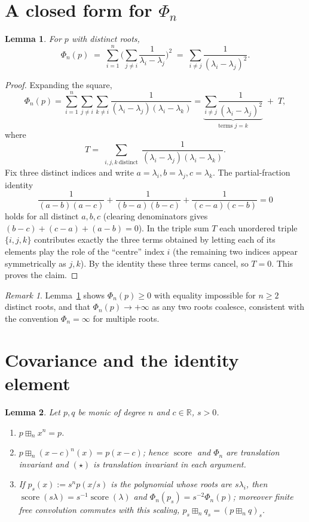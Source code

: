 \documentclass[12pt]{article}
\newtheorem{lemma}{Lemma}
\theoremstyle{remark}
\newtheorem*{remark}{Remark}
\DeclareMathOperator{\score}{score}
\newcommand{\bR}{\mathbb{R}}
\newcommand{\boxp}{\boxplus_n}
\begin{document}
\section{A closed form for $\Phi_n$}\label{sec:identity}

\begin{lemma}\label{lem:phiform}
For $p$ with distinct roots,
\[
\Phi_n(p)\;=\;\sum_{i=1}^n\Big(\sum_{j\neq i}\frac{1}{\lambda_i-\lambda_j}\Big)^2
\;=\;\sum_{i\neq j}\frac{1}{(\lambda_i-\lambda_j)^2}.
\]
\end{lemma}

\begin{proof}
Expanding the square,
\[
\Phi_n(p)=\sum_{i=1}^n\sum_{j\neq i}\sum_{k\neq i}
\frac{1}{(\lambda_i-\lambda_j)(\lambda_i-\lambda_k)}
=\underbrace{\sum_{i\neq j}\frac{1}{(\lambda_i-\lambda_j)^2}}_{\text{terms }j=k}
\;+\;T,
\]
where
\[
T=\sum_{\substack{i,j,k\ \text{distinct}}}
\frac{1}{(\lambda_i-\lambda_j)(\lambda_i-\lambda_k)} .
\]
Fix three distinct indices and write $a=\lambda_i,b=\lambda_j,c=\lambda_k$.
The partial-fraction identity
\[
\frac{1}{(a-b)(a-c)}+\frac{1}{(b-a)(b-c)}+\frac{1}{(c-a)(c-b)}=0
\]
holds for all distinct $a,b,c$ (clearing denominators gives
$(b-c)+(c-a)+(a-b)=0$).  In the triple sum $T$ each unordered triple
$\{i,j,k\}$ contributes exactly the three terms obtained by letting each of its
elements play the role of the ``centre'' index $i$ (the remaining two indices
appear symmetrically as $j,k$).  By the identity these three terms cancel, so
$T=0$.  This proves the claim.
\end{proof}

\begin{remark}
Lemma~\ref{lem:phiform} shows $\Phi_n(p)\ge 0$ with equality impossible for
$n\ge 2$ distinct roots, and that $\Phi_n(p)\to+\infty$ as any two roots
coalesce, consistent with the convention $\Phi_n=\infty$ for multiple roots.
\end{remark}

\section{Covariance and the identity element}\label{sec:cov}

\begin{lemma}\label{lem:cov}
Let $p,q$ be monic of degree $n$ and $c\in\bR$, $s>0$.
\begin{enumerate}
\item[(i)] $p\boxp x^n=p$.
\item[(ii)] $p\boxp (x-c)^n(x)=p(x-c)$; hence $\score$ and $\Phi_n$ are
translation invariant and $(\star)$ is translation invariant in each argument.
\item[(iii)] If $p_s(x):=s^{n}p(x/s)$ is the polynomial whose roots are
$s\lambda_i$, then $\score(s\lambda)=s^{-1}\score(\lambda)$ and
$\Phi_n(p_s)=s^{-2}\Phi_n(p)$; moreover finite free convolution commutes with
this scaling, $p_s\boxp q_s=(p\boxp q)_s$.
\end{enumerate}
\end{lemma}
\end{document}
